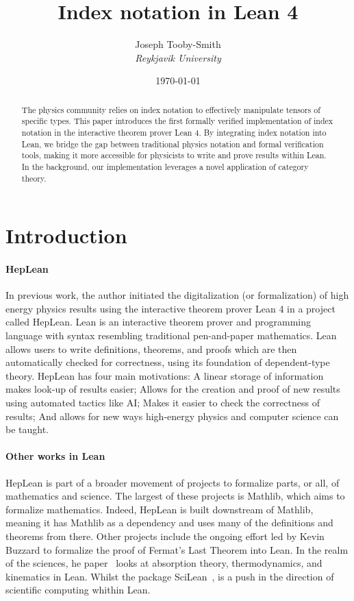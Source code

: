 \documentclass[a4paper, 11pt]{article}
\title{Index notation in Lean 4}
\author{Joseph Tooby-Smith \\ \textit{Reykjavik University}}
\date{\today}
\begin{document}
\maketitle
\vspace{-1cm}
\begin{abstract}
The physics community relies on index notation to effectively manipulate tensors of specific 
types. This paper introduces the first formally verified implementation of index notation in the
interactive theorem prover Lean 4. By integrating index notation into Lean, we bridge the gap between 
traditional physics notation and formal verification tools, 
making it more accessible for physicists to write and prove results within Lean.
In the background, our implementation leverages a novel application of category theory.
\end{abstract}

\section{Introduction}

\paragraph{HepLean} In previous work, the author initiated the digitalization (or formalization) 
of high energy physics 
results using the interactive theorem prover Lean 4 in a project called HepLean. 
Lean is an interactive theorem prover and 
programming language with syntax resembling traditional pen-and-paper mathematics. 
Lean allows users to write definitions, theorems, and proofs 
which are then automatically checked for correctness, using its foundation of dependent-type theory.
HepLean has four main motivations: A linear storage of information makes look-up of results 
easier; Allows for the creation and proof of new results using automated tactics like AI; 
Makes it easier to check the correctness of results; And allows for new ways 
high-energy physics and computer science can be taught. 

\paragraph{Other works in Lean} HepLean is part of a broader movement of projects
to formalize parts, or all, of 
mathematics and science. The largest of these projects is Mathlib, which aims to formalize
mathematics. Indeed, HepLean is built downstream of Mathlib, meaning it has Mathlib as a 
dependency and uses many of the definitions and theorems from there. 
Other projects include the ongoing effort led by Kevin Buzzard to formalize the proof of Fermat's
Last Theorem into Lean. 
In the realm of the sciences, he paper~\cite{josephson} looks at absorption theory, thermodynamics, and kinematics in Lean. 
Whilst the package SciLean~\cite{SciLean}, is a push in the direction of scientific computing whithin Lean. 
\end{document}
